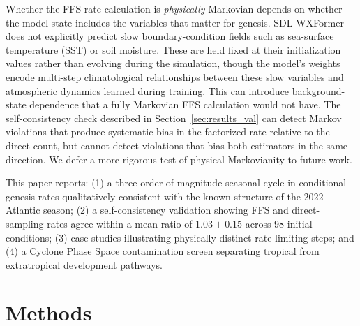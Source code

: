 \documentclass[11pt]{article}
\begin{document}
Whether the FFS rate calculation is \textit{physically} Markovian depends on whether
the model state includes the variables that matter for genesis.
SDL-WXFormer does not explicitly predict slow boundary-condition fields such as
sea-surface temperature (SST) or soil moisture. These are held fixed at their initialization values rather than evolving during the simulation, though the model's weights encode multi-step climatological relationships between these slow variables and atmospheric dynamics learned during training. This can introduce background-state dependence that a fully Markovian FFS calculation
would not have. The self-consistency check described in Section~\ref{sec:results_val} can detect Markov violations that produce systematic bias in the factorized rate relative to the direct count, but cannot detect violations that bias both estimators in the same direction. We defer a more rigorous test of physical Markovianity to future work.

This paper reports: (1) a three-order-of-magnitude seasonal cycle in conditional genesis
rates qualitatively consistent with the known structure of the 2022 Atlantic season; (2) a self-consistency validation showing FFS and direct-sampling rates agree within a mean ratio of $1.03\pm0.15$ across 98 initial conditions; (3) case studies illustrating physically distinct rate-limiting steps; and (4) a Cyclone Phase Space \citep[CPS][]{hart2003cyclone} contamination screen separating tropical from extratropical development pathways.

\section{Methods}
\end{document}
